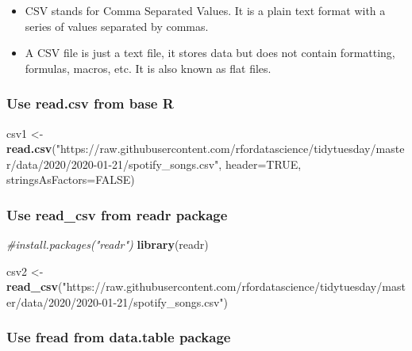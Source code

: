 \documentclass[
]{book}
\newenvironment{Shaded}{\begin{snugshade}}{\end{snugshade}}
\newcommand{\AttributeTok}[1]{\textcolor[rgb]{0.13,0.29,0.53}{#1}}
\newcommand{\CommentTok}[1]{\textcolor[rgb]{0.56,0.35,0.01}{\textit{#1}}}
\newcommand{\ConstantTok}[1]{\textcolor[rgb]{0.56,0.35,0.01}{#1}}
\newcommand{\FunctionTok}[1]{\textcolor[rgb]{0.13,0.29,0.53}{\textbf{#1}}}
\newcommand{\NormalTok}[1]{#1}
\newcommand{\OtherTok}[1]{\textcolor[rgb]{0.56,0.35,0.01}{#1}}
\newcommand{\StringTok}[1]{\textcolor[rgb]{0.31,0.60,0.02}{#1}}
\providecommand{\tightlist}{%
  \setlength{\itemsep}{0pt}\setlength{\parskip}{0pt}}
\begin{document}
\begin{itemize}
\tightlist
\item
  CSV stands for Comma Separated Values. It is a plain text format with a series of values separated by commas.
\item
  A CSV file is just a text file, it stores data but does not contain formatting, formulas, macros, etc. It is also known as flat files.
\end{itemize}

\hypertarget{use-read.csv-from-base-r}{%
\subsubsection*{Use read.csv from base R}\label{use-read.csv-from-base-r}}

\begin{Shaded}
\begin{Highlighting}[]
\NormalTok{csv1 }\OtherTok{\textless{}{-}} \FunctionTok{read.csv}\NormalTok{(}\StringTok{"https://raw.githubusercontent.com/rfordatascience/tidytuesday/master/data/2020/2020{-}01{-}21/spotify\_songs.csv"}\NormalTok{, }\AttributeTok{header=}\ConstantTok{TRUE}\NormalTok{, }\AttributeTok{stringsAsFactors=}\ConstantTok{FALSE}\NormalTok{)}
\end{Highlighting}
\end{Shaded}

\hypertarget{use-read_csv-from-readr-package}{%
\subsubsection*{Use read\_csv from readr package}\label{use-read_csv-from-readr-package}}

\begin{Shaded}
\begin{Highlighting}[]
\CommentTok{\#install.packages("readr")}
\FunctionTok{library}\NormalTok{(readr)}

\NormalTok{csv2 }\OtherTok{\textless{}{-}} \FunctionTok{read\_csv}\NormalTok{(}\StringTok{"https://raw.githubusercontent.com/rfordatascience/tidytuesday/master/data/2020/2020{-}01{-}21/spotify\_songs.csv"}\NormalTok{)}
\end{Highlighting}
\end{Shaded}

\hypertarget{use-fread-from-data.table-package}{%
\subsubsection*{Use fread from data.table package}\label{use-fread-from-data.table-package}}
\end{document}
